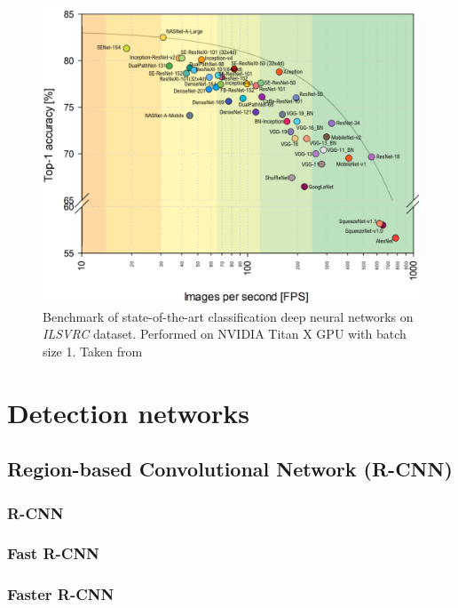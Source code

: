 \begin{figure}
    \includegraphics[width=\textwidth]{img/fps_comp}
    \caption{Benchmark of state-of-the-art classification deep neural networks on \textit{ILSVRC} dataset. Performed on NVIDIA
Titan X GPU with batch size 1. Taken from \cite[fig. 3]{bib:cnnbenchmark}}
    \label{fig:cnnbenchmark}
\end{figure}



\section{Detection networks}
\label{sec:detnets}


\subsection*{Region-based Convolutional Network (R-CNN)}

\subsubsection{R-CNN}
\cite{bib:rcnn}

\subsubsection{Fast R-CNN}
\cite{bib:fastrcnn}

\subsubsection{Faster R-CNN}
\cite{bib:fasterrcnn}

